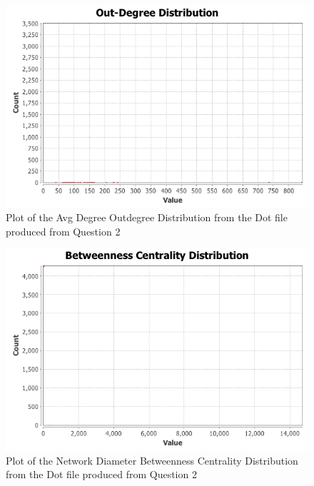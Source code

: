 \documentclass[letterpaper,11pt]{article}
\begin{document}
\begin{figure}[p]
\includegraphics[scale=0.5]{q3/Avg-Degree/outdegree-distribution.png}
\caption{Plot of the Avg Degree Outdegree Distribution from the Dot file produced from Question 2}
\label{fig:q3avgdegree-outdegree-distribution}
\end{figure}

\begin{figure}[p]
\includegraphics[scale=0.5]{"q3/Network-Diameter/Betweenness Centrality Distribution"}
\caption{Plot of the Network Diameter Betweenness Centrality Distribution from the Dot file produced from Question 2}
\label{fig:q3netdiam-betweenness}
\end{figure}
\end{document}
